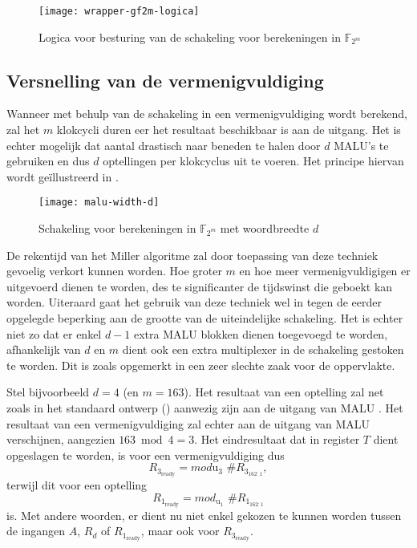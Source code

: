 \begin{figure}[h]
	\centering
		\texttt{[image: wrapper-gf2m-logica]}
		\caption{Logica voor besturing van de schakeling voor berekeningen in $\mathbb{F}_{2^m}$\label{figuur-implementatie-wrapper-gf2m-logica}}
\end{figure}

\subsection{Versnelling van de vermenigvuldiging\label{subsectie-implementatie-gf2m-versnelling}}

Wanneer met behulp van de schakeling in  een vermenigvuldiging wordt berekend, zal het $m$ klokcycli duren eer het resultaat beschikbaar is aan de uitgang. Het is echter mogelijk dat aantal drastisch naar beneden te halen door $d$ MALU's te gebruiken en dus $d$ optellingen per klokcyclus uit te voeren. Het principe hiervan wordt ge\"illustreerd in .

\begin{figure}[h]
	\centering
		\texttt{[image: malu-width-d]}
		\caption{Schakeling voor berekeningen in $\mathbb{F}_{2^m}$ met woordbreedte $d$\label{figuur-implementatie-wrapper-gf2m-d}}
\end{figure}

De rekentijd van het Miller algoritme zal door toepassing van deze techniek gevoelig verkort kunnen worden. Hoe groter $m$ en hoe meer vermenigvuldigigen er uitgevoerd dienen te worden, des te significanter de tijdswinst die geboekt kan worden. Uiteraard gaat het gebruik van deze techniek wel in tegen de eerder opgelegde beperking aan de grootte van de uiteindelijke schakeling. Het is echter niet zo dat er enkel $d - 1$ extra MALU blokken dienen toegevoegd te worden, afhankelijk van $d$ en $m$ dient ook een extra multiplexer in de schakeling gestoken te worden. Dit is zoals opgemerkt in  een zeer slechte zaak voor de  oppervlakte.

Stel bijvoorbeeld $d = 4$ (en $m = 	163$). Het resultaat van een optelling zal net zoals in het standaard ontwerp () aanwezig zijn aan de uitgang van MALU . Het resultaat van een vermenigvuldiging zal echter aan de uitgang van MALU  verschijnen, aangezien $163 \bmod 4 = 3$. Het eindresultaat dat in register $T$ dient opgeslagen te worden, is voor een vermenigvuldiging dus
\[R_{3_{\text{ready}}} = mod{\text{u}_3} \text{ \# } R_{3_{162:1}},\]
terwijl dit voor een optelling
\[R_{1_{\text{ready}}} = mod_{\text{u}_1} \text{ \# } R_{1_{162:1}}\]
is. Met andere woorden, er dient nu niet enkel gekozen te kunnen worden tussen de ingangen $A$, $R_d$ of $R_{1_{\text{ready}}}$, maar ook voor $R_{3_{\text{ready}}}$.

